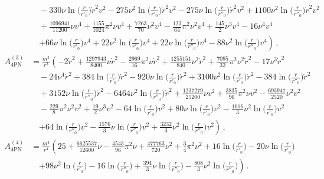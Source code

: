 \documentclass[prd,preprint,superscriptaddress,tightenlines,nofootinbib,
  eqsecnum,showpacs]{revtex4}
\begin{document}
\begin{subequations}
\begin{align}
&\quad  - 330 \nu \ln\Big(\frac{r}{r'_{0}}\Big) \dot{r}^2 v^{2}
 - 275 \nu^2 \ln\Big(\frac{r}{r'_{0}}\Big) \dot{r}^2 v^{2}
 - 275 \nu \ln\Big(\frac{r}{r''_{0}}\Big) \dot{r}^2 v^{2}
 + 1100 \nu^2 \ln\Big(\frac{r}{r''_{0}}\Big) \dot{r}^2 v^{2}\nonumber\\
&\quad  + \frac{1096941}{11200} \nu v^{4}
 + \frac{1155}{1024} \pi^2 \nu v^{4}
 + \frac{7263}{70} \nu^2 v^{4}
 -  \frac{123}{64} \pi^2 \nu^2 v^{4}
 + \frac{145}{2} \nu^3 v^{4}
 - 16 \nu^4 v^{4}\nonumber\\
&\quad \left. + 66 \nu \ln\Big(\frac{r}{r'_{0}}\Big) v^{4}
 + 22 \nu^2 \ln\Big(\frac{r}{r'_{0}}\Big) v^{4}
 + 22 \nu \ln\Big(\frac{r}{r''_{0}}\Big) v^{4}
 - 88 \nu^2 \ln\Big(\frac{r}{r''_{0}}\Big) v^{4}\right) \,,\\
A^{(3)}_\text{4PN} &= \frac{m^3}{r^3} \left(-2 \dot{r}^2
 + \frac{1297943}{8400} \nu \dot{r}^2
 -  \frac{2969}{16} \pi^2 \nu \dot{r}^2
 + \frac{1255151}{840} \nu^2 \dot{r}^2
 + \frac{7095}{32} \pi^2 \nu^2 \dot{r}^2
 - 17 \nu^3 \dot{r}^2 \right.\nonumber\\
& \quad - 24 \nu^4 \dot{r}^2
 + 384 \ln\Big(\frac{r}{r'_{0}}\Big) \dot{r}^2
 - 920 \nu \ln\Big(\frac{r}{r'_{0}}\Big) \dot{r}^2
 + 3100 \nu^2 \ln\Big(\frac{r}{r'_{0}}\Big) \dot{r}^2
 - 384 \ln\Big(\frac{r}{r''_{0}}\Big) \dot{r}^2\nonumber\\
& \quad + 3152 \nu \ln\Big(\frac{r}{r''_{0}}\Big) \dot{r}^2
 - 6464 \nu^2 \ln\Big(\frac{r}{r''_{0}}\Big) \dot{r}^2
 + \frac{1237279}{25200} \nu v^{2}
 + \frac{3835}{96} \pi^2 \nu v^{2}
 -  \frac{693947}{2520} \nu^2 v^{2}\nonumber\\
&\quad  -  \frac{229}{8} \pi^2 \nu^2 v^{2}
 + \frac{19}{2} \nu^3 v^{2}
 - 64 \ln\Big(\frac{r}{r'_{0}}\Big) v^{2}
 + 80 \nu \ln\Big(\frac{r}{r'_{0}}\Big) v^{2}
 -  \frac{1616}{3} \nu^2 \ln\Big(\frac{r}{r'_{0}}\Big) v^{2}\nonumber\\
&\quad\left. + 64 \ln\Big(\frac{r}{r''_{0}}\Big) v^{2}
 -  \frac{1576}{3} \nu \ln\Big(\frac{r}{r''_{0}}\Big) v^{2}
 + \frac{3232}{3} \nu^2 \ln\Big(\frac{r}{r''_{0}}\Big) v^{2}\right) \,,\\
A^{(4)}_\text{4PN} &= \frac{m^4}{r^4} \left(25
 + \frac{6625537}{12600} \nu
 -  \frac{4543}{96} \pi^2 \nu
 + \frac{477763}{720} \nu^2
 + \frac{3}{4} \pi^2 \nu^2
 + 16 \ln\Big(\frac{r}{r'_{0}}\Big)
 - 20 \nu \ln\Big(\frac{r}{r'_{0}}\Big) \right. \nonumber\\
& \quad \left. + 98 \nu^2 \ln\Big(\frac{r}{r'_{0}}\Big)
 - 16 \ln\Big(\frac{r}{r''_{0}}\Big)
 + \frac{394}{3} \nu \ln\Big(\frac{r}{r''_{0}}\Big)
 -  \frac{808}{3} \nu^2 \ln\Big(\frac{r}{r''_{0}}\Big)\right)\,.
\end{align}\end{subequations}
\end{document}
